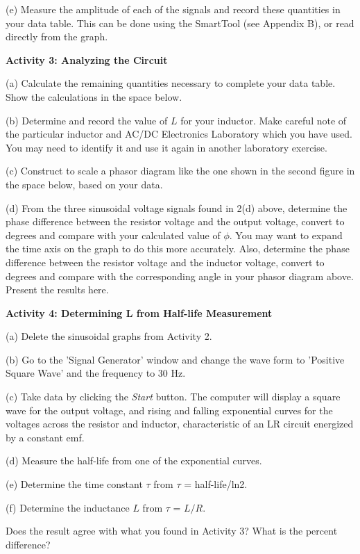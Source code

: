 (e) Measure the amplitude of each of the signals and record these
quantities in your data table. This can be done using the SmartTool 
(see Appendix B), or read directly from the graph.

\textbf{Activity 3: Analyzing the Circuit}
 
(a) Calculate the remaining quantities necessary to complete your
data table. Show the calculations in the space below.
\vspace{3in}

(b) Determine and record the  value of $L$  for your inductor.
Make careful note of
the particular inductor and AC/DC Electronics Laboratory
which you have used. You may need to identify
it and use it again in another laboratory exercise.
\vspace{1.5in}

\newpage

(c) Construct to scale a phasor diagram like the one shown in the
second figure in the space below, based on your data.
\vspace{2in}


(d) From the three sinusoidal voltage signals found in 2(d) above, determine the phase difference between the resistor voltage and the output voltage, convert to degrees and compare with your calculated value of \( \phi  \). You may want to expand the time axis on the graph to do this more accurately. Also, determine the phase difference between the resistor voltage and the inductor voltage, convert to degrees and compare with the corresponding angle in your phasor diagram above. Present the results here.
\vspace{1.2in}

\textbf{Activity 4: Determining L from Half-life Measurement}

(a) Delete the sinusoidal graphs from Activity 2.

(b) Go to the 'Signal Generator' window and change the wave form to 'Positive Square Wave' and the frequency to 30 Hz. 

(c) Take data by clicking the \emph{Start} button. The computer will display a square wave for the output voltage, and rising and falling exponential curves for the voltages across the resistor and inductor, characteristic of an LR circuit energized by a constant emf.

(d) Measure the half-life from one of the exponential curves.
\vspace{10mm}

(e) Determine the time constant \( \tau  \) from \( \tau  \) = half-life/ln2.
\vspace{10mm}

(f) Determine the inductance $L$ from \( \tau  \) = $L/R$.
\vspace{15mm}

Does the result agree with what you found in Activity 3? What is the percent difference?




